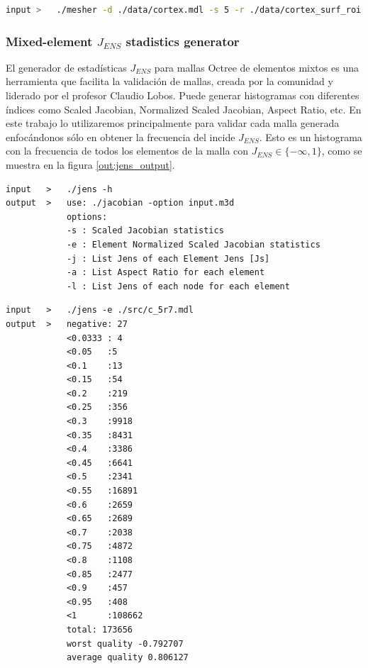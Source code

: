 \begin{lstlisting}[language=bash,caption={Input mesher generator para la generación de la malla inicial.\\ Fuente: Elaboración propia.},label={out:mesher_example}]
input >   ./mesher -d ./data/cortex.mdl -s 5 -r ./data/cortex_surf_roi.mdl 7 -u c_5r7 -m -v
\end{lstlisting}

\subsubsection{Mixed-element $J_{ENS}$ stadistics generator}

El generador de estadísticas $J_{ENS}$ para mallas Octree de elementos mixtos es una herramienta que facilita la validación de mallas, creada por la comunidad y liderado por el profesor Claudio Lobos. Puede generar histogramas con diferentes índices como Scaled Jacobian, Normalized Scaled Jacobian, Aspect Ratio, etc. 
En este trabajo lo utilizaremos principalmente para validar cada malla generada enfocándonos sólo en obtener la frecuencia del incide $J_{ENS}$. Esto es un histograma con la frecuencia de todos los elementos de la malla con $J_{ENS} \in \{-\infty , 1\}$, como se muestra en la figura \autoref{out:jens_output}.

\begin{lstlisting}[style=console,caption={Opciones de jens calculator. \\ Fuente: Elaboración propia.}]
input   >   ./jens -h
output  >   use: ./jacobian -option input.m3d
            options:
            -s : Scaled Jacobian statistics
            -e : Element Normalized Scaled Jacobian statistics
            -j : List Jens of each Element Jens [Js]
            -a : List Aspect Ratio for each element
            -l : List Jens of each node for each element
\end{lstlisting}


\begin{lstlisting}[style=console,label={out:jens_output_c_5r7_0},caption={Estadísticas Jens para malla inicial, muestra una lista de frecuencias para diferentes cotas superiores para la calidad Jens encontrada en la malla.\\ Fuente: Elaboración propia.}]
input   >   ./jens -e ./src/c_5r7.mdl
output  >   negative: 27
            <0.0333 : 4
            <0.05   :5
            <0.1    :13
            <0.15   :54
            <0.2    :219
            <0.25   :356
            <0.3    :9918
            <0.35   :8431
            <0.4    :3386
            <0.45   :6641
            <0.5    :2341
            <0.55   :16891
            <0.6    :2659
            <0.65   :2689
            <0.7    :2038
            <0.75   :4872
            <0.8    :1108
            <0.85   :2477
            <0.9    :457
            <0.95   :408
            <1      :108662
            total: 173656
            worst quality -0.792707
            average quality 0.806127
\end{lstlisting}


